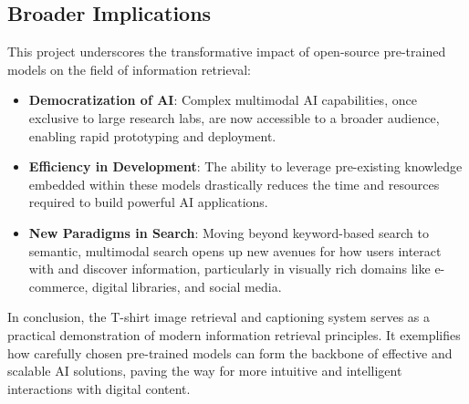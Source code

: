\documentclass{article}
\begin{document}
\subsection{Broader Implications}
This project underscores the transformative impact of open-source pre-trained models on the field of information retrieval:
\begin{itemize}
    \item \textbf{Democratization of AI}: Complex multimodal AI capabilities, once exclusive to large research labs, are now accessible to a broader audience, enabling rapid prototyping and deployment.
    \item \textbf{Efficiency in Development}: The ability to leverage pre-existing knowledge embedded within these models drastically reduces the time and resources required to build powerful AI applications.
    \item \textbf{New Paradigms in Search}: Moving beyond keyword-based search to semantic, multimodal search opens up new avenues for how users interact with and discover information, particularly in visually rich domains like e-commerce, digital libraries, and social media.
\end{itemize}
In conclusion, the T-shirt image retrieval and captioning system serves as a practical demonstration of modern information retrieval principles. It exemplifies how carefully chosen pre-trained models can form the backbone of effective and scalable AI solutions, paving the way for more intuitive and intelligent interactions with digital content.


\end{document}
